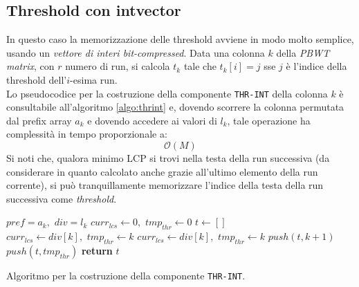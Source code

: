 \subsection{Threshold con intvector}
In questo caso la memorizzazione delle threshold avviene in modo molto semplice,
usando un \textit{vettore di interi bit-compressed}. Data una colonna $k$ della
\textit{PBWT matrix}, con $r$ numero di run, si calcola $t_k$ tale che
$t_k[i]=j$ sse $j$ è l'indice della threshold dell'$i$-esima run.\\
Lo pseudocodice per la costruzione della componente
\texttt{THR-INT} della colonna $k$ è consultabile all'algoritmo
\ref{algo:thrint} 
e, dovendo scorrere la colonna permutata dal prefix array $a_k$ e dovendo
accedere ai valori di $l_k$, tale operazione ha complessità in tempo
proporzionale a:
\begin{equation}
  \label{eq:thrint}
  \mathcal{O}(M)
\end{equation}
Si noti che, qualora minimo LCP si trovi nella testa della run successiva (da
considerare in quanto calcolato anche grazie all'ultimo elemento della run
corrente), si può tranquillamente memorizzare l'indice della testa della run
successiva come \textit{threshold}.
\begin{algorithm}
  \begin{algorithmic}
    \Comment $pref=a_k,\,\,div=l_k$
    \State $curr_{lcs}\gets 0,\,\,tmp_{thr}\gets 0$
    \State $t\gets[]$
    \For {\textit{every} $k\in\left[0,\,\, M\right)$}
    \State $curr_{lcs}\gets div[k],\,\,tmp_{thr}\gets k$
    \EndIf
    \State $curr_{lcs}\gets div[k],\,\,tmp_{thr}\gets k$
    \EndIf
    \State $push(t, k+1)$
    \Else 
    \State $push(t, tmp_{thr})$
    \EndIf
    \EndIf
    \EndFor
    \State \textbf{return} $t$  
    \EndFunction
  \end{algorithmic}
  \caption{Algoritmo per la costruzione della componente \texttt{THR-INT}.}
  \label{algo:thrint}
\end{algorithm}

